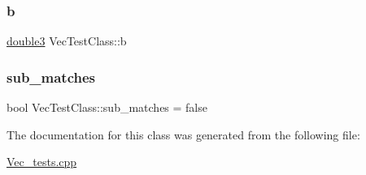 \subsubsection{\texorpdfstring{b}{b}}
{\footnotesize\ttfamily \hyperlink{Vec_8h_aca95f98e6008aee8e3744e99d7826608}{double3} Vec\+Test\+Class\+::b\hspace{0.3cm}{\ttfamily [protected]}}

\mbox{\label{classVecTestClass_aa16462e2c2d464e46d3452b97e38940e}} 
\subsubsection{\texorpdfstring{sub\+\_\+matches}{sub\_matches}}
{\footnotesize\ttfamily bool Vec\+Test\+Class\+::sub\+\_\+matches = false\hspace{0.3cm}{\ttfamily [protected]}}



The documentation for this class was generated from the following file\+:\begin{DoxyCompactItemize}
\item 
\hyperlink{Vec__tests_8cpp}{Vec\+\_\+tests.\+cpp}\end{DoxyCompactItemize}
